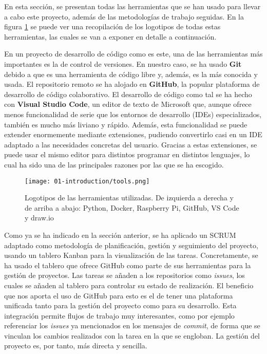 En esta sección, se presentan todas las herramientas que se han usado para
llevar a cabo este proyecto, además de las metodologías de trabajo seguidas. En
la figura \ref{fig:01-tools} se puede ver una recopilación de los logotipos de
todas estas herramientas, las cuales se van a exponer en detalle a continuación.

En un proyecto de desarrollo de código como es este, una de las herramientas más
importantes es la de control de versiones. En nuestro caso, se ha usado
\textbf{Git} debido a que es una herramienta de código libre y, además, es la
más conocida y usada. El repositorio remoto se ha alojado en \textbf{GitHub}, la
popular plataforma de desarrollo de código colaborativo. El desarrollo de código
como tal se ha hecho con \textbf{Visual Studio Code}, un editor de texto de
Microsoft que, aunque ofrece menos funcionalidad de serie que los entornos de
desarrollo (IDEs) especializados, también es mucho más liviano y rápido. Además,
esta funcionalidad se puede extender enormemente mediante extensiones, pudiendo
convertirlo casi en un IDE adaptado a las necesidades concretas del usuario.
Gracias a estas extensiones, se puede usar el mismo editor para distintos
programar en distintos lenguajes, lo cual ha sido una de las principales razones
por las que se ha escogido.

\begin{figure}[H]
      \centering
      \texttt{[image: 01-introduction/tools.png]}
      \caption{Logotipos de las herramientas utilizadas. De izquierda a derecha y%
            de arriba a abajo: Python, Docker, Raspberry Pi, GitHub, VS Code y
            draw.io}
      \label{fig:01-tools}
\end{figure}

Como ya se ha indicado en la sección anterior, se ha aplicado un SCRUM adaptado
como metodología de planificación, gestión y seguimiento del proyecto, usando un
tablero Kanban para la visualización de las tareas. Concretamente, se ha usado
el tablero que ofrece GitHub como parte de sus herramientas para la gestión de
proyectos. Las tareas se añaden a los repositorios como \textit{issues}, los
cuales se añaden al tablero para controlar su estado de realización. El
beneficio que nos aporta el uso de GitHub para esto es el de tener una
plataforma unificada tanto para la gestión del proyecto como para su desarrollo.
Esta integración permite flujos de trabajo muy interesantes, como por ejemplo
referenciar los \textit{issues} ya mencionados en los mensajes de
\textit{commit}, de forma que se vinculan los cambios realizados con la tarea en
la que se engloban. La gestión del proyecto es, por tanto, más directa y
sencilla.

